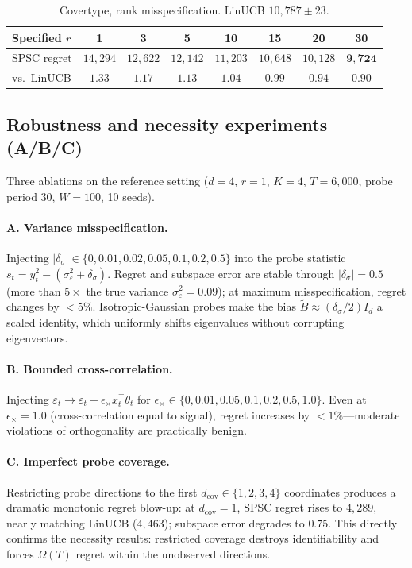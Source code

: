 \documentclass{article}
\begin{document}
\begin{table}[!htbp]
\centering
\caption{Covertype, rank misspecification. LinUCB $10{,}787\pm 23$.}
\label{tab:rank_misspec}
\small
\begin{tabular}{lccccccc}
\toprule
Specified $r$ & 1 & 3 & 5 & \textbf{10} & 15 & 20 & 30 \\
\midrule
SPSC regret & $14{,}294$ & $12{,}622$ & $12{,}142$ & $11{,}203$ & $10{,}648$ & $10{,}128$ & $\mathbf{9{,}724}$ \\
vs.\ LinUCB & $1.33$ & $1.17$ & $1.13$ & $1.04$ & $0.99$ & $0.94$ & $\mathbf{0.90}$ \\
\bottomrule
\end{tabular}
\end{table}

\subsection{Robustness and necessity experiments (A/B/C)}
\label{app:robustness_abc}

Three ablations on the reference setting ($d{=}4$, $r{=}1$, $K{=}4$,
$T{=}6{,}000$, probe period 30, $W{=}100$, 10 seeds).

\paragraph{A. Variance misspecification.}
Injecting $|\delta_\sigma|\in\{0,0.01,0.02,0.05,0.1,0.2,0.5\}$ into
the probe statistic $s_t=y_t^2-(\sigma_\varepsilon^2+\delta_\sigma)$.
Regret and subspace error are stable through $|\delta_\sigma|=0.5$
(more than $5\times$ the true variance $\sigma_\varepsilon^2=0.09$);
at maximum misspecification, regret changes by $<5\%$. Isotropic-Gaussian
probes make the bias $\widetilde B\approx(\delta_\sigma/2)I_d$ a
scaled identity, which uniformly shifts eigenvalues without
corrupting eigenvectors.

\paragraph{B. Bounded cross-correlation.}
Injecting $\varepsilon_t\to\varepsilon_t+\epsilon_\times x_t^\top\theta_t$
for $\epsilon_\times\in\{0,0.01,0.05,0.1,0.2,0.5,1.0\}$. Even at
$\epsilon_\times=1.0$ (cross-correlation equal to signal), regret
increases by $<1\%$---moderate violations of orthogonality are
practically benign.

\paragraph{C. Imperfect probe coverage.}
Restricting probe directions to the first $d_{\mathrm{cov}}\in\{1,2,3,4\}$
coordinates produces a dramatic monotonic regret blow-up: at
$d_{\mathrm{cov}}=1$, SPSC regret rises to $4{,}289$, nearly
matching LinUCB ($4{,}463$); subspace error degrades to $0.75$.
This directly confirms the necessity results: restricted coverage
destroys identifiability and forces $\Omega(T)$ regret within the
unobserved directions.
\end{document}
